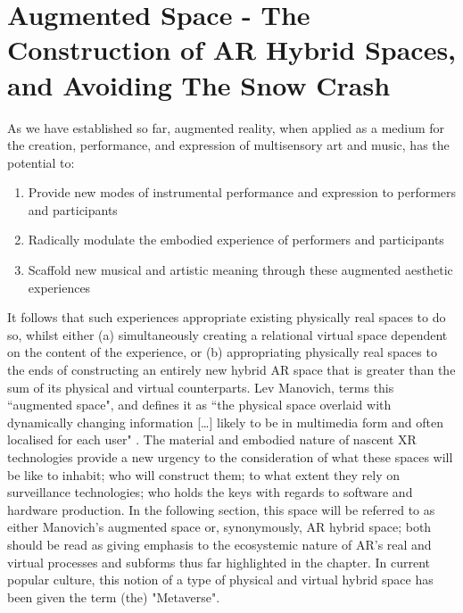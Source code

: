 \section[Augmented Space]{Augmented Space - The Construction of AR Hybrid Spaces, and Avoiding The Snow Crash}\label{sec: theory-space}
As we have established so far, augmented reality, when applied as a medium for the creation, performance, and expression of multisensory art and music, has the potential to:
\begin{enumerate}
    \item Provide new modes of instrumental performance and expression to performers and participants
    \item Radically modulate the embodied experience of performers and participants
    \item Scaffold new musical and artistic meaning through these augmented aesthetic experiences
\end{enumerate}
It follows that such experiences appropriate existing physically real spaces to do so, whilst either (a) simultaneously creating a relational virtual space dependent on the content of the experience, or (b) appropriating physically real spaces to the ends of constructing an entirely new hybrid AR space that is greater than the sum of its physical and virtual counterparts. Lev Manovich, terms this ``augmented space", and defines it as ``the physical space overlaid with dynamically changing information […] likely to be in multimedia form and often localised for each user" \citep[p. 2]{manovich2006}. The material and embodied nature of nascent XR technologies provide a new urgency to the consideration of what these spaces will be like to inhabit; who will construct them; to what extent they rely on surveillance technologies; who holds the keys with regards to software and hardware production. In the following section, this space will be referred to as either Manovich's augmented space or, synonymously, AR hybrid space; both should be read as giving emphasis to the ecosystemic nature of AR's real and virtual processes and subforms thus far highlighted in the chapter.  In current popular culture, this notion of a type of physical and virtual hybrid space has been given the term (the) "Metaverse".

